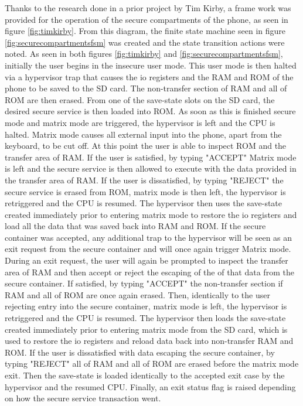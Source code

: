 Thanks to the research done in a prior project by Tim Kirby, a frame work was provided for the operation of the secure compartments of the phone, as seen in figure \ref{fig:timkirby}. From this diagram, the finite state machine seen in figure \ref{fig:securecompartmentsfsm} was created and the state transition actions were noted. As seen in both figures \ref{fig:timkirby} and \ref{fig:securecompartmentsfsm}, initially the user begins in the insecure user mode. This user mode is then halted via a hypervisor trap that causes the io registers and the RAM and ROM of the phone to be saved to the SD card. The non-transfer section of RAM and all of ROM are then erased. From one of the save-state slots on the SD card, the desired secure service is then loaded into ROM. As soon as this is finished secure mode and matrix mode are triggered, the hypervisor is left and the CPU is halted. Matrix mode causes all external input into the phone, apart from the keyboard, to be cut off. At this point the user is able to inspect ROM and the transfer area of RAM. If the user is satisfied, by typing "ACCEPT" Matrix mode is left and the secure service is then allowed to execute with the data provided in the transfer area of RAM. If the user is dissatisfied, by typing "REJECT" the secure service is erased from ROM, matrix mode is then left, the hypervisor is retriggered and the CPU is resumed. The hypervisor then uses the save-state created immediately prior to entering matrix mode to restore the io registers and load all the data that was saved back into RAM and ROM. If the secure container was accepted, any additional trap to the hypervisor will be seen as an exit request from the secure container and will once again trigger Matrix mode. During an exit request, the user will again be prompted to inspect the transfer area of RAM and then accept or reject the escaping of the of that data from the secure container. If satisfied, by typing "ACCEPT" the non-transfer section if RAM and all of ROM are once again erased. Then, identically to the user rejecting entry into the secure container, matrix mode is left, the hypervisor is retriggered and the CPU is resumed. The hypervisor then loads the save-state created immediately prior to entering matrix mode from the SD card, which is used to restore the io registers and reload data back into non-transfer RAM and ROM. If the user is dissatisfied with data escaping the secure container, by typing "REJECT" all of RAM and all of ROM are erased before the matrix mode exit. Then the save-state is loaded identically to the accepted exit case by the hypervisor and the resumed CPU. Finally, an exit status flag is raised depending on how the secure service transaction went.

